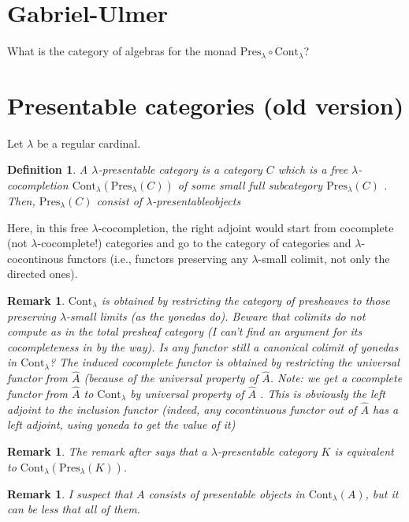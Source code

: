 \documentclass{article}
\newcommand{\Cont}[1]{\text{Cont}_{#1}}
\newcommand{\Pres}[1]{\text{Pres}_{#1}}
\newtheorem{definition}[theorem]{Definition}
\newtheorem{remark}[theorem]{Remark}
\begin{document}
\section{Gabriel-Ulmer}
What is the category of algebras for the monad $\Pres\lambda\circ\Cont\lambda$?

  \section{Presentable categories (old version)}
  Let $\lambda$ be a regular cardinal.
  \begin{definition}
  A $\lambda$-presentable category is a
  category $C$ which is a free $\lambda$-cocompletion
  $\Cont\lambda(\Pres\lambda(C))$ of
  some small full subcategory $\Pres\lambda(C)$
     \cite[Representation theorem 1.46]{adamek_rosicky}.
	  Then, $\Pres\lambda(C)$ consist of \emph{$\lambda$-presentableobjects}
  \end{definition}

  Here, in this free $\lambda$-cocompletion, the right adjoint would start
  from 
  cocomplete (not $\lambda$-cocomplete!) categories and go to the category of
  categories and $\lambda$-cocontinous functors (i.e., functors preserving any
  $\lambda$-small colimit, not only the directed ones).
  \begin{remark}
	  $\Cont\lambda$ is 
	  obtained by restricting the category of presheaves to those preserving $\lambda$-small limits (as the yonedas do). Beware that colimits do not compute as in the total presheaf category (I can't find an argument for its cocompleteness in \cite{adamek_rosicky} by the way).
	  Is any functor still a canonical colimit of yonedas in $\Cont\lambda$?
	  The induced cocomplete functor is obtained by restricting the universal functor from $\hat{A}$ (because of the universal property of $\hat{A}$. Note: we get a cocomplete functor  from 
	  $\hat{A}$ to $\Cont\lambda$ by universal property of $\hat{A}$ .
	  This is obviously the left adjoint to the inclusion functor
	  (indeed, any cocontinuous functor out of $\hat{A}$ has a left adjoint, using yoneda to get the value of it)
  \end{remark}
  \begin{remark}
	  The remark after
     \cite[Representation theorem 1.46]{adamek_rosicky} says that a $\lambda$-presentable
	  category $K$ is equivalent to $\Cont\lambda(\Pres\lambda(K))$.
  \end{remark}
  \begin{remark}
	  I suspect that $A$ consists of presentable objects in $\Cont\lambda(A)$, but it can be less that all of them.
  \end{remark}
\end{document}
